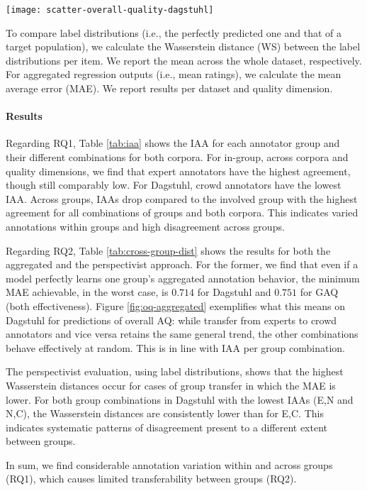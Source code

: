\begin{figure*}[t]
    \centering
    \texttt{[image: scatter-overall-quality-dagstuhl]}
    \caption{Instance-based aggregation of label decisions for overall AQ, assessed on a scale from 1 (low) to 3 (high), between two annotator groups on Dagstuhl, with a fitted linear regression model highlighting their relationship.}
    \label{fig:oq-aggregated}
\end{figure*}

To compare label distributions (i.e., the perfectly predicted one and that of a target population), we calculate the Wasserstein distance (WS) between the label distributions per item. We report the mean across the whole dataset, respectively. For aggregated regression outputs (i.e., mean ratings), we calculate the mean average error (MAE). We report results per dataset and quality dimension.

\paragraph{Results}
Regarding RQ1, Table \ref{tab:iaa} shows the IAA for each annotator group and their different combinations for both corpora. For in-group, across corpora and quality dimensions, we find that expert annotators have the highest agreement, though still comparably low. For Dagstuhl, crowd annotators have the lowest IAA. Across groups, IAAs drop compared to the involved group with the highest agreement for all combinations of groups and both corpora. This indicates varied annotations within groups and high disagreement across groups.

Regarding RQ2, Table \ref{tab:cross-group-dist} shows the results for both the aggregated and the perspectivist approach. For the former, we find that even if a model perfectly learns one group's aggregated annotation behavior, the minimum MAE achievable, in the worst case, is $0.714$ for Dagstuhl and $0.751$ for GAQ (both effectiveness). Figure \ref{fig:oq-aggregated} exemplifies what this means on Dagstuhl for predictions of overall AQ: while transfer from experts to crowd annotators and vice versa retains the same general trend, the other combinations behave effectively at random. This is in line with IAA per group combination.

The perspectivist evaluation, using label distributions, shows that the highest Wasserstein distances occur for cases of group transfer in which the MAE is lower. For both group combinations in Dagstuhl with the lowest IAAs (E,N and N,C), the Wasserstein distances are consistently lower than for E,C. This indicates systematic patterns of disagreement present to a different extent between groups.

In sum, we find considerable annotation variation within and across groups (RQ1), which causes limited transferability between groups (RQ2). 
